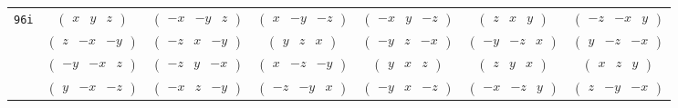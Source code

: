\documentclass[fleqn,9pt,landscape]{jsarticle}
\begin{document}
\begin{center}
\begin{longtable}{ccccccc}
{\tt 96i} & $ \begin{pmatrix} x & y & z \end{pmatrix} $ & $ \begin{pmatrix} - x & - y & z \end{pmatrix} $ & $ \begin{pmatrix} x & - y & - z \end{pmatrix} $ & $ \begin{pmatrix} - x & y & - z \end{pmatrix} $ & $ \begin{pmatrix} z & x & y \end{pmatrix} $ & $ \begin{pmatrix} - z & - x & y \end{pmatrix} $ \\
& $ \begin{pmatrix} z & - x & - y \end{pmatrix} $ & $ \begin{pmatrix} - z & x & - y \end{pmatrix} $ & $ \begin{pmatrix} y & z & x \end{pmatrix} $ & $ \begin{pmatrix} - y & z & - x \end{pmatrix} $ & $ \begin{pmatrix} - y & - z & x \end{pmatrix} $ & $ \begin{pmatrix} y & - z & - x \end{pmatrix} $ \\
& $ \begin{pmatrix} - y & - x & z \end{pmatrix} $ & $ \begin{pmatrix} - z & y & - x \end{pmatrix} $ & $ \begin{pmatrix} x & - z & - y \end{pmatrix} $ & $ \begin{pmatrix} y & x & z \end{pmatrix} $ & $ \begin{pmatrix} z & y & x \end{pmatrix} $ & $ \begin{pmatrix} x & z & y \end{pmatrix} $ \\
& $ \begin{pmatrix} y & - x & - z \end{pmatrix} $ & $ \begin{pmatrix} - x & z & - y \end{pmatrix} $ & $ \begin{pmatrix} - z & - y & x \end{pmatrix} $ & $ \begin{pmatrix} - y & x & - z \end{pmatrix} $ & $ \begin{pmatrix} - x & - z & y \end{pmatrix} $ & $ \begin{pmatrix} z & - y & - x \end{pmatrix} $ \\

\end{longtable}
\end{center}
\end{document}
